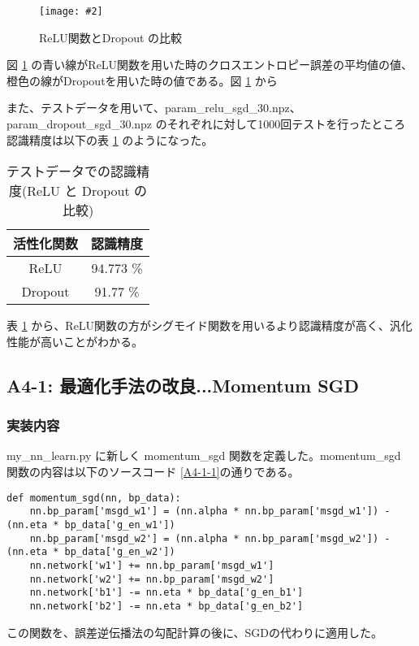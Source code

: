 \documentclass[a4paper,dvipdfmx]{jsarticle}
\newcommand{\image}[3]{
    \begin{figure}[H]
        \begin{center}
        \texttt{[image: \#2]}
        \end{center}
        \caption{#1}
        \label{#3}
    \end{figure}
}
\begin{document}
\image{ReLU関数とDropout の比較}{report_a2-1.png}{fig-A-2-1}

図 \ref{fig-A-2-1} の青い線がReLU関数を用いた時のクロスエントロピー誤差の平均値の値、橙色の線がDropoutを用いた時の値である。図 \ref{fig-A-2-1} から

また、テストデータを用いて、param\_relu\_sgd\_30.npz、param\_dropout\_sgd\_30.npz のそれぞれに対して1000回テストを行ったところ認識精度は以下の表 \ref{table-A1-1} のようになった。

\begin{table}[H]
\begin{center}
\caption{テストデータでの認識精度(ReLU と Dropout の比較)}
  \begin{tabular}{|c|c|} \hline
    活性化関数 & 認識精度  \\ \hline \hline
    ReLU & 94.773 \% \\ \hline
    Dropout & 91.77 \% \\ \hline
  \end{tabular}
	\label{table-A1-1}
\end{center}
\end{table}

表 \ref{table-A1-1} から、ReLU関数の方がシグモイド関数を用いるより認識精度が高く、汎化性能が高いことがわかる。
 
\subsection*{A4-1: 最適化手法の改良...Momentum SGD}

\subsubsection*{実装内容}
my\_nn\_learn.py に新しく momentum\_sgd 関数を定義した。momentum\_sgd 関数の内容は以下のソースコード \ref{A4-1-1}の通りである。
\begin{lstlisting}[caption="Momentum SGD",label=A4-1-1]
def momentum_sgd(nn, bp_data):
    nn.bp_param['msgd_w1'] = (nn.alpha * nn.bp_param['msgd_w1']) - (nn.eta * bp_data['g_en_w1'])
    nn.bp_param['msgd_w2'] = (nn.alpha * nn.bp_param['msgd_w2']) - (nn.eta * bp_data['g_en_w2'])
    nn.network['w1'] += nn.bp_param['msgd_w1']
    nn.network['w2'] += nn.bp_param['msgd_w2']
    nn.network['b1'] -= nn.eta * bp_data['g_en_b1']
    nn.network['b2'] -= nn.eta * bp_data['g_en_b2']
\end{lstlisting}

この関数を、誤差逆伝播法の勾配計算の後に、SGDの代わりに適用した。
\end{document}
